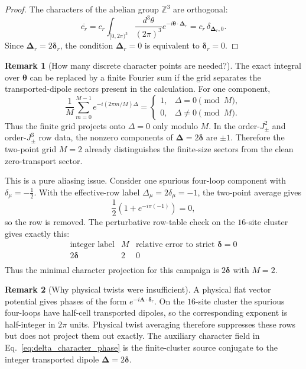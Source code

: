 \documentclass[11pt,letterpaper]{article}
\newcommand{\Jpm}{J_{\pm}}
\newcommand{\bA}{\bm A}
\newcommand{\bdelta}{\bm \delta}
\newcommand{\bDelta}{\bm \Delta}
\newcommand{\btheta}{\bm \theta}
\newcommand{\Z}{\mathbb Z}
\theoremstyle{plain}
\theoremstyle{definition}
\newtheorem{remark}{Remark}
\begin{document}
\begin{proof}
The characters of the abelian group $\Z^3$ are orthogonal:
\[
\overline{c_r}
=c_r\int_{[0,2\pi)^3}\frac{d^3\theta}{(2\pi)^3}
e^{-i\btheta\cdot\bDelta_r}
=c_r\,\delta_{\bDelta_r,0}.
\]
Since $\bDelta_r=2\bdelta_r$, the condition $\bDelta_r=0$ is equivalent to
$\bdelta_r=0$.
\end{proof}

\begin{remark}[How many discrete character points are needed?]
The exact integral over $\btheta$ can be replaced by a finite Fourier sum if
the grid separates the transported-dipole sectors present in the calculation.
For one component,
\[
\frac1M\sum_{m=0}^{M-1}
e^{-i(2\pi m/M)\Delta}
=
\begin{cases}
1,& \Delta=0\pmod M,\\
0,& \Delta\ne0\pmod M.
\end{cases}
\]
Thus the finite grid projects onto $\Delta=0$ only modulo $M$.  In the
order-$\Jpm^2$ and order-$\Jpm^3$ row data, the nonzero components of
$\bDelta=2\bdelta$ are $\pm1$.  Therefore the two-point grid $M=2$ already
distinguishes the finite-size sectors from the clean zero-transport sector.

This is a pure aliasing issue.  Consider one spurious four-loop component with
$\delta_\mu=-\frac12$.  With the effective-row label
$\Delta_\mu=2\delta_\mu=-1$, the two-point average gives
\[
\frac12\left(1+e^{-i\pi(-1)}\right)=0,
\]
so the row is removed.  The perturbative row-table check on the $16$-site
cluster gives exactly this:
\[
\begin{array}{c|c|c}
\text{integer label} & M & \text{relative error to strict }\bdelta=0\\
\hline
2\bdelta & 2 & 0\\
\end{array}
\]
Thus the minimal character projection for this campaign is $2\bdelta$ with
$M=2$.
\end{remark}

\begin{remark}[Why physical twists were insufficient]
A physical flat vector potential gives phases of the form
$e^{-i\bA\cdot\bdelta_r}$.  On the $16$-site cluster the spurious four-loops
have half-cell transported dipoles, so the corresponding exponent is
half-integer in $2\pi$ units.  Physical twist averaging therefore suppresses
these rows but does not project them out exactly.  The auxiliary character
field in Eq.~\eqref{eq:delta_character_phase} is the finite-cluster source
conjugate to the integer transported dipole $\bDelta=2\bdelta$.
\end{remark}
\end{document}
